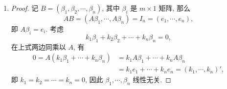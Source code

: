 \begin{enumerate}
\begin{proof}
            即
            \[
                \alpha_1 = l_2\alpha_2 + \cdots + l_m\alpha_m,    
            \]
            又由已知条件 $\beta$ 可由 $\alpha_1, \cdots, \alpha_m$ 线性表示, 即
            \[
                \beta = k_1\alpha_1 + \cdots + k_m\alpha_m,    
            \]
            将 $\alpha_1$ 的线性表示带入上式, 有
            \begin{align*}
                \beta &= k_1(l_2\alpha_2 + \cdots + l_m\alpha_m) + k_2\alpha_2 + \cdots + k_m\alpha_m \\
                &=  (k_1l_2 + k_2)\alpha_2 + \cdots + (k_1l_m + k_m)\alpha_m  
            \end{align*}
            即 $\beta$ 可由 $\alpha_2, \cdots, \alpha_m$ 这 $m - 1$ 个向量线性表示, 与题意矛盾. 因此 $\alpha_1, \cdots, \alpha_m$ 线性无关.
        \end{proof}
    \item %
        \begin{proof}
            记 $B = (\beta_1, \beta_2, \cdots, \beta_n)$, 其中 $\beta_i$ 是 $m\times1$ 矩阵, 那么
            \[
                AB = (A\beta_1, \cdots, A\beta_n) = I_n = (e_1, \cdots, e_n),    
            \]
            即 $A\beta_i = e_i$. 考虑
            \[
                k_1\beta_1 + k_2\beta_2 + \cdots + k_n\beta_n = 0,
            \]
            在上式两边同乘以 $A$, 有
            \begin{align*}
                0 = A(k_1\beta_1 + \cdots + k_n\beta_n) &= k_1A\beta_1 + \cdots + k_nA\beta_n \\
                &= k_1e_1 + \cdots + k_ne_n = (k_1, \cdots, k_n)',  
            \end{align*}
            即 $k_1 = k_2 = \cdots = k_n = 0$, 因此 $\beta_1, \cdots, \beta_n$ 线性无关.
        \end{proof}
\end{enumerate}
% 
